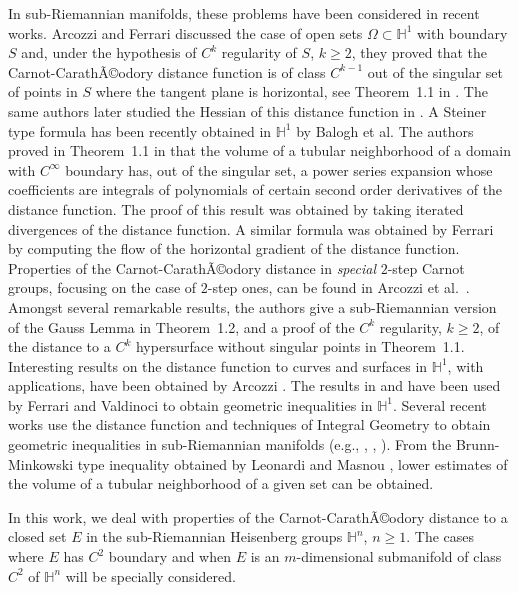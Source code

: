\documentclass[10pt]{amsart}
\theoremstyle{definition}
\theoremstyle{remark}
\numberwithin{equation}{section}
\begin{document}
In sub-Riemannian manifolds, these problems have been considered in recent works. Arcozzi and Ferrari discussed the case of open sets ${\Omega}\subset{{\mathbb{H}}}^1$ with boundary $S$ and, under the hypothesis of $C^k$ regularity of $S$, $k{\geqslant} 2$, they proved that the Carnot-CarathÃ©odory distance function is of class $C^{k-1}$ out of the singular set of points in $S$ where the tangent plane is horizontal, see Theorem~1.1 in \cite{MR2299576}. The same authors later studied the Hessian of this distance function in \cite{MR2386836}. A Steiner type formula has been recently obtained in ${{\mathbb{H}}}^1$ by Balogh et al. The authors proved in Theorem~1.1 in \cite{MR3388879} that the volume of a tubular neighborhood of a domain with $C^\infty$ boundary has, out of the singular set, a power series expansion whose coefficients are integrals of polynomials of certain second order derivatives of the distance function. The proof of this result was obtained by taking iterated divergences of the distance function. A similar formula was obtained by Ferrari \cite{MR2384641} by computing the flow of the horizontal gradient of the distance function. Properties of the Carnot-CarathÃ©odory distance in \textit{special} $2$-step Carnot groups, focusing on the case of $2$-step ones, can be found in  Arcozzi et al.~\cite{afm-17}. Amongst several remarkable results, the authors give a sub-Riemannian version of the Gauss Lemma in Theorem~1.2, and a proof of the $C^k$ regularity, $k{\geqslant} 2$, of the distance to a $C^k$ hypersurface without singular points in Theorem~1.1. 
Interesting results on the distance function to curves and surfaces in ${{\mathbb{H}}}^1$, with applications, have been obtained by Arcozzi \cite{arcozzi-talk}. The results in \cite{MR2299576} and \cite{MR2386836} have been used by Ferrari and Valdinoci \cite[\S~2]{MR2461257} to obtain geometric inequalities in ${{\mathbb{H}}}^1$.
Several recent works use the distance function and techniques of Integral Geometry to obtain geometric inequalities in sub-Riemannian manifolds (e.g., \cite{MR2548248}, \cite{1509.00950}, \cite{huang-agms}). From the Brunn-Minkowski type inequality obtained by Leonardi and Masnou \cite{MR2177813}, lower estimates of the volume of a tubular neighborhood of a given set can be obtained. 

In this work, we deal with properties of the Carnot-CarathÃ©odory distance to a closed set $E$ in the sub-Riemannian Heisenberg groups ${{\mathbb{H}}}^n$, $n{\geqslant} 1$. The cases where $E$ has $C^2$ boundary and when $E$ is an $m$-dimensional submanifold of class $C^2$ of ${{\mathbb{H}}}^n$ will be specially considered.
\end{document}
